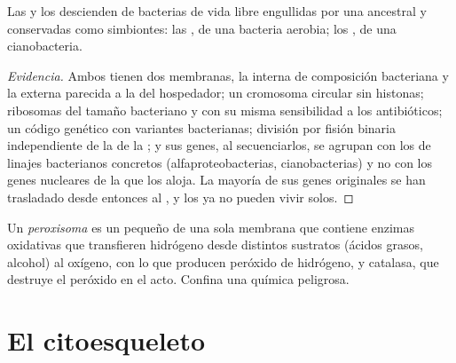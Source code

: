 \begin{proposition}\label{prop:b1:eukaryotic-cell:endosymbiosis}
Las  y los  descienden de bacterias de vida libre
engullidas por una  ancestral y conservadas como simbiontes:
las , de una bacteria aerobia; los , de una cianobacteria.
\end{proposition}
\begin{proof}[Evidencia]
Ambos  tienen dos membranas, la interna de composición bacteriana y
la externa parecida a la del hospedador; un cromosoma circular sin histonas;
ribosomas del tamaño bacteriano y con su misma sensibilidad a los
antibióticos; un código genético con variantes bacterianas; división por
fisión binaria independiente de la de la ; y sus genes, al
secuenciarlos, se agrupan con los de linajes bacterianos concretos
(alfaproteobacterias, cianobacterias) y no con los genes nucleares de la
 que los aloja. La mayoría de sus genes originales se han trasladado
desde entonces al , y los  ya no pueden vivir solos.
\end{proof}

\begin{definition}[Peroxisoma]\label{def:b1:eukaryotic-cell:peroxisome}
Un \emph{peroxisoma} es un  pequeño de una sola
membrana que contiene enzimas oxidativas que transfieren hidrógeno desde
distintos sustratos (ácidos grasos, alcohol) al oxígeno, con lo que producen
peróxido de hidrógeno, y catalasa, que destruye el peróxido en el acto.
Confina una química peligrosa.
\end{definition}

\section{El citoesqueleto}


